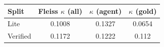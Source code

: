 \begin{tabular}{lccc}
\toprule
Split & Fleiss $\kappa$ (all) & $\kappa$ (agent) & $\kappa$ (gold) \\
\midrule
Lite & 0.1008 & 0.1327 & 0.0654 \\
Verified & 0.1172 & 0.1222 & 0.112 \\
\bottomrule
\end{tabular}
